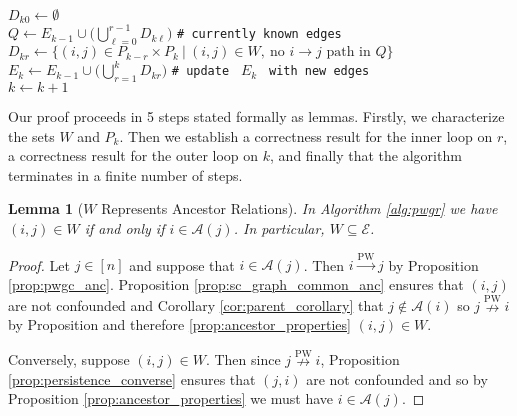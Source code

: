 \documentclass{statsoc}
\def\pwgc{\overset{\text{PW}}{\rightarrow}}  %
\def\npwgc{\overset{\text{PW}}{\nrightarrow}}  %
\def\gcge{\mathcal{E}}  %
\newcommand{\anc}[1]{\mathcal{A}(#1)}  %
\newtheorem{lemma}{Lemma}
\begin{document}
\begin{algorithm}[H]
{    $D_{k0} \leftarrow \emptyset$\\
    {
      $Q \leftarrow E_{k - 1} \cup \big(\bigcup_{\ell = 0}^{r - 1} D_{k\ell}\big)$ \texttt{\# currently known edges}\\
      $D_{kr} \leftarrow \{(i, j) \in P_{k - r} \times P_k\ |\ (i, j) \in W,\ \text{no } i \rightarrow j \text{ path in } Q\}$
    }
    $E_k \leftarrow E_{k - 1} \cup \big(\bigcup_{r = 1}^k D_{kr}\big)$ \texttt{\# update } $E_k$ \texttt{ with new edges}\\
    $k \leftarrow k + 1$
  }
\end{algorithm}

Our proof proceeds in 5 steps stated formally as lemmas.  Firstly, we
characterize the sets $W$ and $P_k$.  Then we establish a correctness
result for the inner loop on $r$, a correctness result for the outer
loop on $k$, and finally that the algorithm terminates in a finite
number of steps.

\begin{lemma}[$W$ Represents Ancestor Relations]
  \label{lem:W_subset_E}
  In Algorithm \ref{alg:pwgr} we have
  $(i, j) \in W$ if and only if $i \in \anc{j}$.  In particular,
  $W \subseteq \gcge$.
\end{lemma}
\begin{proof}
  Let $j \in [n]$ and suppose that $i \in \anc{j}$.  Then $i \pwgc j$
  by Proposition \ref{prop:pwgc_anc}.  Proposition
  \ref{prop:sc_graph_common_anc} ensures that $(i, j)$ are not
  confounded and Corollary \ref{cor:parent_corollary} that
  $j \not\in \anc{i}$ so $j \npwgc i$ by Proposition and therefore
  \ref{prop:ancestor_properties} $(i, j) \in W$.

  Conversely, suppose $(i, j) \in W$.  Then since $j \npwgc i$,
  Proposition \ref{prop:persistence_converse} ensures that $(j, i)$
  are not confounded and so by Proposition \ref{prop:ancestor_properties}
  we must have $i \in \anc{j}$.
\end{proof}
\end{document}
